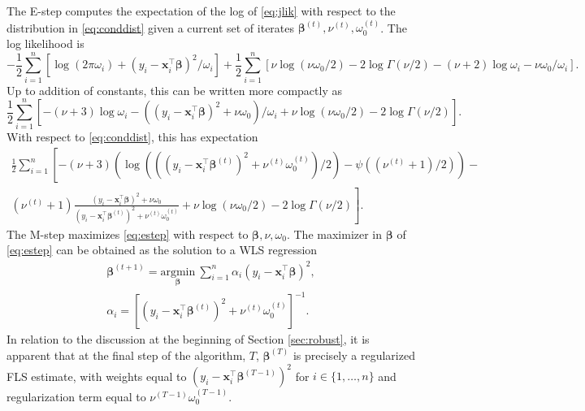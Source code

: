 \documentclass[12pt]{article}
\newcommand{\bl}[1]{{\mathbf #1}}
\newcommand{\bs}[1]{\boldsymbol #1}
\begin{document}
The E-step computes the expectation of the log of \eqref{eq:jlik} with respect to the distribution in \eqref{eq:conddist} given a current set of iterates $\bs{\beta}^{(t)}, \nu^{(t)}, \omega_0^{(t)}$. The log likelihood is
\begin{equation*}
-\frac{1}{2}\sum_{i=1}^n [\log(2 \pi \omega_i) + (y_i - \bl{x}_i^\top \bs{\beta})^2/\omega_i] +\frac{1}{2}\sum_{i=1}^n [\nu\log(\nu \omega_0 / 2) - 2\log \Gamma (\nu / 2) - (\nu + 2)\log \omega_i - \nu \omega_0 / \omega_i].
\end{equation*}
Up to addition of constants, this can be written more compactly as
\begin{equation*}
\frac{1}{2} \sum_{i=1}^n [-(\nu+3) \log \omega_i - ((y_i - \bl{x}_i^\top \bs{\beta})^2 + \nu \omega_0)/\omega_i + \nu \log(\nu \omega_0/2) - 2\log \Gamma(\nu/2)].
\end{equation*}
With respect to \eqref{eq:conddist}, this has expectation
\begin{equation}\label{eq:estep}
\begin{aligned}
   \frac{1}{2} \sum_{i=1}^n \left[-(\nu+3) (\log(((y_i - \bl{x}_i^\top \bs{\beta}^{(t)})^2 + \nu^{(t)} \omega_0^{(t)})/2) - \psi((\nu^{(t)}+1)/2)) -\right. \\\left.(\nu^{(t)}+1)\frac{(y_i - \bl{x}_i^\top \bs{\beta})^2 +
    \nu \omega_0}{(y_i - \bl{x}_i^\top \bs{\beta}^{(t)})^2 + \nu^{(t)} \omega_0^{(t)}} + \nu \log(\nu \omega_0/2) - 2\log \Gamma(\nu/2)\right].
\end{aligned}
\end{equation}
The M-step maximizes \eqref{eq:estep} with respect to $\bs \beta, \nu, \omega_0$. The maximizer in $\bs{\beta}$ of \eqref{eq:estep} can be obtained as the solution to a WLS regression
\begin{equation*}
\begin{aligned}
    \bs{\beta}^{(t+1)} = \underset{\bs{\beta}}{\mathrm{argmin}} ~ \sum_{i=1}^n \alpha_i (y_i - \bl{x}_i^\top \bs{\beta})^2, \\
    \alpha_i = [(y_i - \bl{x}_i^\top \bs{\beta}^{(t)})^2 + \nu^{(t)} \omega_0^{(t)}]^{-1}.
\end{aligned}
\end{equation*}
In relation to the discussion at the beginning of Section \ref{sec:robust}, it is apparent that at the final step of the algorithm, $T$, $\bs{\beta}^{(T)}$ is precisely a regularized FLS estimate, with weights equal to $(y_i - \bl{x}_i^\top \bs{\beta}^{(T-1)})^2$ for $i \in \{1, \dots, n\}$ and regularization term equal to $\nu^{(T-1)} \omega_0^{(T-1)}$.
\end{document}
